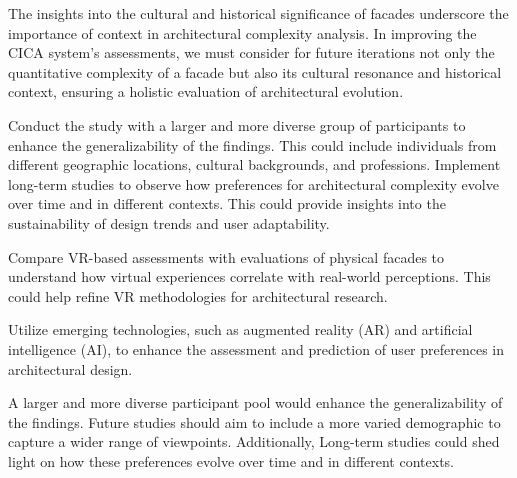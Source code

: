 


The insights into the cultural and historical significance of facades underscore the importance of context in architectural complexity analysis.
In improving the CICA system's assessments, we must consider for future iterations not only the quantitative complexity of a facade but also its cultural resonance and historical context, ensuring a holistic evaluation of architectural evolution.

Conduct the study with a larger and more diverse group of participants to enhance the generalizability of the findings. This could include individuals from different geographic locations, cultural backgrounds, and professions.
 Implement long-term studies to observe how preferences for architectural complexity evolve over time and in different contexts. This could provide insights into the sustainability of design trends and user adaptability.

Compare VR-based assessments with evaluations of physical facades to understand how virtual experiences correlate with real-world perceptions. This could help refine VR methodologies for architectural research.

Utilize emerging technologies, such as augmented reality (AR) and artificial intelligence (AI), to enhance the assessment and prediction of user preferences in architectural design.

 A larger and more diverse participant pool would enhance the generalizability of the findings.
Future studies should aim to include a more varied demographic to capture a wider range of viewpoints.
Additionally, Long-term studies could shed light on how these preferences evolve over time and in different contexts.

